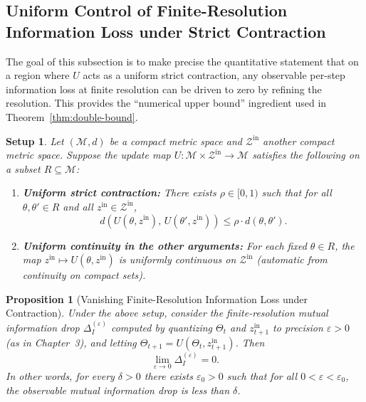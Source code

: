 \documentclass[12pt]{article}
\theoremstyle{definition}
\theoremstyle{plain}
\newtheorem{setup}{Setup}[section]
\newtheorem{proposition}{Proposition}[section]
\begin{document}
\subsection{Uniform Control of Finite-Resolution Information Loss under Strict Contraction}
\label{subsec:uniform-control}

The goal of this subsection is to make precise the quantitative statement that on a region where \(U\) acts as a uniform strict contraction, any observable per-step information loss at finite resolution can be driven to zero by refining the resolution.  This provides the ``numerical upper bound'' ingredient used in Theorem~\ref{thm:double-bound}.

\begin{setup}
Let \((\mathcal{M},d)\) be a compact metric space and \(\mathcal{Z}^{\mathrm{in}}\) another compact metric space.  Suppose the update map \(U:\mathcal{M}\times\mathcal{Z}^{\mathrm{in}}\to\mathcal{M}\) satisfies the following on a subset \(R\subseteq\mathcal{M}\):
\begin{enumerate}
    \item \textbf{Uniform strict contraction:} There exists \(\rho\in[0,1)\) such that for all \(\theta,\theta'\in R\) and all \(z^{\mathrm{in}}\in\mathcal{Z}^{\mathrm{in}}\),
    \[
    d\!\left(U(\theta,z^{\mathrm{in}}),\,U(\theta',z^{\mathrm{in}})\right) \le \rho\cdot d(\theta,\theta').
    \]
    \item \textbf{Uniform continuity in the other arguments:} For each fixed \(\theta\in R\), the map \(z^{\mathrm{in}}\mapsto U(\theta,z^{\mathrm{in}})\) is uniformly continuous on \(\mathcal{Z}^{\mathrm{in}}\) (automatic from continuity on compact sets).
\end{enumerate}
\end{setup}

\begin{proposition}[Vanishing Finite-Resolution Information Loss under Contraction]
\label{prop:vanishing-info-loss}
Under the above setup, consider the finite-resolution mutual information drop \(\Delta_I^{(\varepsilon)}\) computed by quantizing \(\Theta_t\) and \(z_{t+1}^{\mathrm{in}}\) to precision \(\varepsilon>0\) (as in Chapter~3), and letting \(\Theta_{t+1}=U(\Theta_t,z_{t+1}^{\mathrm{in}})\). Then
\[
\lim_{\varepsilon\to 0} \Delta_I^{(\varepsilon)} = 0.
\]
In other words, for every \(\delta>0\) there exists \(\varepsilon_0>0\) such that for all \(0<\varepsilon<\varepsilon_0\), the observable mutual information drop is less than \(\delta\).
\end{proposition}
\end{document}
